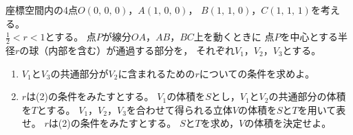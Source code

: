 \documentclass[../../main.tex]{subfiles}
\begin{document}
座標空間内の4点$O(0, \, 0, \, 0)$，$A(1, \, 0, \, 0)$，
$B(1, \, 1, \, 0)$，$C(1, \, 1, \, 1)$を考える。\\
$\displaystyle\frac{1}{2}<r<1$とする。
点$P$が線分$OA$，$AB$，$BC$上を動くときに
点$P$を中心とする半径$r$の球（内部を含む）が通過する部分を，
それぞれ$V_1$，$V_2$，$V_3$とする。
\begin{enumerate}
  $y=t$が$V_1$，$V_3$双方と共有点をもつような$t$の範囲を与えよ。
    さらに，この範囲の$t$に対し，
    平面$y=t$と$V_1$の共通部分および，平面$y=t$と$V_3$の共通部分を
    同一平面上に図示せよ。
  \item$V_1$と$V_3$の共通部分が$V_2$に含まれるための$r$についての条件を求めよ。
  \item$r$は(2)の条件をみたすとする。
    $V_1$の体積を$S$とし，$V_1$と$V_2$の共通部分の体積を$T$とする。
    $V_1$，$V_2$，$V_3$を合わせて得られる立体$V$の体積を$S$と$T$を用いて表せ。
  $r$は(2)の条件をみたすとする。
    $S$と$T$を求め，$V$の体積を決定せよ。
\end{enumerate}
\end{document}
